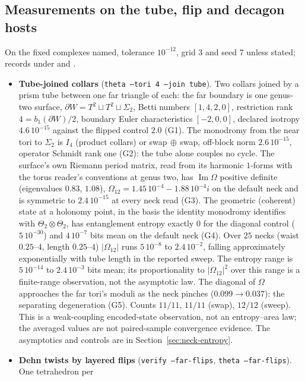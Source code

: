\documentclass[11pt]{article}
\theoremstyle{definition}
\theoremstyle{remark}
\begin{document}
\subsection{Measurements on the tube, flip and decagon hosts}\label{sec:evidence-merged}
On the fixed complexes named, tolerance $10^{-12}$, grid $3$ and seed $7$
unless stated; records under  and
.
\begin{itemize}
\item \textbf{Tube-joined collars} (\texttt{theta --tori 4 --join tube}).
Two collars joined by a prism tube between one far triangle of each: the far
boundary is one genus-two surface, $\partial W = T^2\sqcup T^2\sqcup\Sigma_2$,
Betti numbers $[1,4,2,0]$, restriction rank $4 = b_1(\partial W)/2$, boundary
Euler characteristics $[-2,0,0]$, declared isotropy $4.6\,10^{-15}$ against
the flipped control $2.0$ (G1). The monodromy from the near tori to
$\Sigma_2$ is $I_4$ (product collars) or swap$\,\oplus\,$swap, off-block
norm $2.6\,10^{-15}$, operator Schmidt rank one (G2): the tube alone couples
no cycle. The surface's own Riemann period matrix, read from its harmonic
$1$-forms with the torus reader's conventions at genus two, has
$\operatorname{Im}\Omega$ positive definite (eigenvalues $0.83$, $1.08$),
$\Omega_{12} = 1.45\,10^{-4} - 1.88\,10^{-4}i$ on the default neck and is
symmetric to $2.4\,10^{-15}$ at every neck read (G3). The geometric
(coherent) state at a holonomy point, in the basis the identity monodromy
identifies with $\Theta_2\otimes\Theta_2$, has entanglement entropy exactly
$0$ for the diagonal control ($5\,10^{-30}$) and $4\,10^{-7}$ bits mean on
the default neck (G4). Over $25$ necks (waist $0.25$--$4$, length
$0.25$--$4$) $|\Omega_{12}|$ runs $5\,10^{-8}$ to $2.4\,10^{-2}$, falling
approximately exponentially with tube length in the reported sweep.
The entropy range is $5\,10^{-14}$ to $2.4\,10^{-3}$ bits mean; its
proportionality to $|\Omega_{12}|^2$ over this range is a finite-range
observation, not the asymptotic law.
The diagonal of $\Omega$
approaches the far tori's moduli as the neck pinches ($0.099\to0.037$): the
separating degeneration (G5). Counts $11/11$, $11/11$ (swap), $12/12$
(sweep). This is a weak-coupling encoded-state observation, not an
entropy--area law; the averaged values are not paired-sample convergence
evidence. The asymptotics and controls are in
Section~\ref{sec:neck-entropy}.
\item \textbf{Dehn twists by layered flips}
(\texttt{verify --far-flips}, \texttt{theta --far-flips}). One tetrahedron per

\end{itemize}
\end{document}

